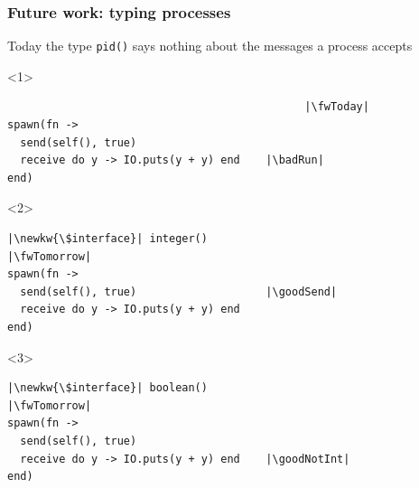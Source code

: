 \begin{frame}[fragile,t]
\frametitle{Future work: typing processes}
{\color{gray}Today the type \texttt{pid()} says nothing about the messages a process accepts\par}
\bigskip
\begin{block}{\vspace{-5mm}}
\begin{onlyenv}<1>
\begin{verbatim}
                                              |\fwToday|
spawn(fn ->
  send(self(), true)
  receive do y -> IO.puts(y + y) end    |\badRun|
end)
\end{verbatim}
\end{onlyenv}
\begin{onlyenv}<2>
\begin{verbatim}
|\newkw{\$interface}| integer()                            |\fwTomorrow|
spawn(fn ->
  send(self(), true)                    |\goodSend|
  receive do y -> IO.puts(y + y) end
end)
\end{verbatim}
\end{onlyenv}
\begin{onlyenv}<3>
\begin{verbatim}
|\newkw{\$interface}| boolean()                            |\fwTomorrow|
spawn(fn ->
  send(self(), true)
  receive do y -> IO.puts(y + y) end    |\goodNotInt|
end)
\end{verbatim}
\end{onlyenv}
\end{block}
\end{frame}


